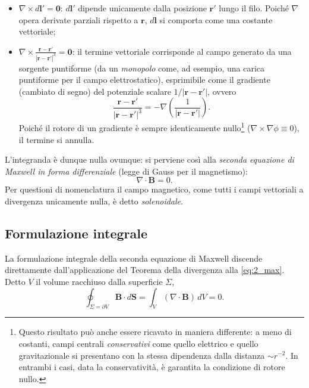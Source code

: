 \documentclass[a4paper,11pt]{report}
\begin{document}
\begin{itemize}
    \item $\nabla \times d\bm{l}' = \bm{0}$: $d\bm{l}'$ dipende unicamente dalla posizione $\bm{r}'$ lungo il filo. Poiché $\nabla$ opera derivate parziali rispetto a $\bm{r}$, $d\bm{l}$ si comporta come una costante vettoriale;
    \item $\nabla \times \frac{\bm{r}-\bm{r}'}{|\bm{r}-\bm{r}'|^3} = \bm{0}$: il termine vettoriale corrisponde al campo generato da una sorgente puntiforme (da un \textit{monopolo} come, ad esempio, una carica puntiforme per il campo elettrostatico), esprimibile come il gradiente (cambiato di segno) del potenziale scalare $1/|\bm{r}-\bm{r}'|$, ovvero 
    \begin{equation}
 \frac{\bm{r}-\bm{r}'}{|\bm{r}-\bm{r}'|^3} = -\nabla \left(\frac{1}{|\bm{r}-\bm{r}'|}\right).
 \label{eq:help}
 \end{equation}
  Poiché il rotore di un gradiente è sempre identicamente nullo\footnote{Questo risultato può anche essere ricavato in maniera differente: a meno di costanti, campi centrali \textit{conservativi} come quello elettrico e quello gravitazionale si presentano con la stessa dipendenza dalla distanza $\sim r^{-2}$. In entrambi i casi, data la conservatività, è garantita la condizione di rotore nullo.} ($\nabla \times \nabla \phi \equiv 0$), il termine si annulla.
\end{itemize}
L'integranda è dunque nulla ovunque: si perviene così alla \textit{seconda equazione di Maxwell in forma differenziale} (legge di Gauss per il magnetismo):
\begin{equation}
{
    \nabla \cdot \bm{B} = 0}.
    \label{eq:2_max}
\end{equation}
Per questioni di nomenclatura il campo magnetico, come tutti i campi vettoriali a divergenza unicamente nulla, è detto \textit{solenoidale}.

\subsection{Formulazione integrale}
La formulazione integrale della seconda equazione di Maxwell discende direttamente dall'applicazione del Teorema della divergenza alla \eqref{eq:2_max}. Detto $V$ il volume racchiuso dalla superficie $\Sigma$, 
\begin{equation}
{
    \oint_{\Sigma = \partial V} \bm{B} \cdot d\bm{S} = \int_V (\nabla \cdot \bm{B}) \, dV = 0}.
\end{equation}
\end{document}
